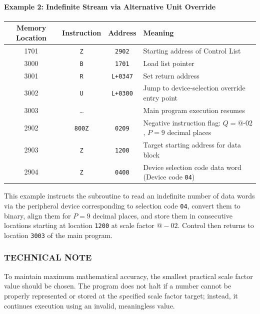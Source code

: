 \paragraph{Example 2: Indefinite Stream via Alternative Unit Override}
\begin{table}[h!]
\centering
\begin{tabularx}{\textwidth}{cccX}
\toprule
\textbf{Memory Location} & \textbf{Instruction} & \textbf{Address} & \textbf{Meaning} \\
\midrule
    1701              & \texttt{Z}      & \texttt{2902}    & Starting address of Control List \\
    3000              & \texttt{B}      & \texttt{1701}    & Load list pointer \\
    3001              & \texttt{R}      & \texttt{L+0347}  & Set return address \\
    3002              & \texttt{U}      & \texttt{L+0300}  & Jump to device-selection override entry point \\
    3003              & \dots           &                  & Main program execution resumes \\
    \midrule
    2902              & \texttt{800Z}   & \texttt{0209}    & Negative instruction flag: $Q = \text{@-02}$, $P = 9$ decimal places \\
    2903              & \texttt{Z}      & \texttt{1200}    & Target starting address for data block \\
2904              & \texttt{Z}      & \texttt{0400}    & Device selection code data word (Device code \texttt{04}) \\
\bottomrule
\end{tabularx}
\end{table}
This example instructs the subroutine to read an indefinite number of data words via the peripheral device corresponding to selection code \texttt{04}, convert them to binary, align them for $P=9$ decimal places, and store them in consecutive locations starting at location \texttt{1200} at scale factor $@-02$. Control then returns to location \texttt{3003} of the main program.

\subsubsection*{TECHNICAL NOTE}
To maintain maximum mathematical accuracy, the smallest practical scale factor value should be chosen. The program does not halt if a number cannot be properly represented or stored at the specified scale factor target; instead, it continues execution using an invalid, meaningless value.
\newpage